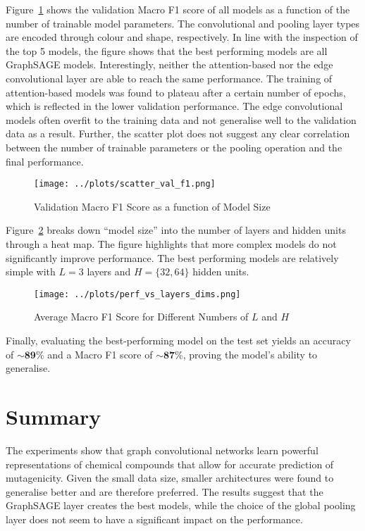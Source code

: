 \documentclass[10pt,conference,compsocconf]{IEEEtran}
\begin{document}
Figure~\ref{fig:scatter-val-f1} shows the validation Macro F1 score of all
models as a function of the number of trainable model parameters. The
convolutional and pooling layer types are encoded through colour and shape,
respectively. In line with the inspection of the top 5 models, the figure shows
that the best performing models are all GraphSAGE models. Interestingly, neither
the attention-based nor the edge convolutional layer are able to reach the same
performance. The training of attention-based models was found to plateau after a
certain number of epochs, which is reflected in the lower validation
performance. The edge convolutional models often overfit to the training data
and not generalise well to the validation data as a result. Further, the
scatter plot does not suggest any clear correlation between the number of
trainable parameters or the pooling operation and the final performance.

\begin{figure}[ht]
  \centering
  \texttt{[image: ../plots/scatter\_val\_f1.png]}
  \caption{Validation Macro F1 Score as a function of Model Size}
  \label{fig:scatter-val-f1}
\end{figure}

Figure~\ref{fig:perf_vs_layers} breaks down ``model size'' into the number of
layers and hidden units through a heat map. The figure highlights that more
complex models do not significantly improve performance. The best performing
models are relatively simple with $L=3$ layers and $H=\{32, 64\}$ hidden units.

\begin{figure}[ht]
  \centering
  \texttt{[image: ../plots/perf\_vs\_layers\_dims.png]}
  \caption{Average Macro F1 Score for Different Numbers of $L$ and $H$}
  \label{fig:perf_vs_layers}
\end{figure}

Finally, evaluating the best-performing model on the test set yields an accuracy
of $\sim\mathbf{89}\%$ and a Macro F1 score of $\sim\mathbf{87}\%$, proving the
model's ability to generalise.

\section{Summary}

The experiments show that graph convolutional networks learn powerful
representations of chemical compounds that allow for accurate prediction of
mutagenicity. Given the small data size, smaller architectures were found to
generalise better and are therefore preferred. The results suggest that the
GraphSAGE layer creates the best models, while the choice of the global pooling
layer does not seem to have a significant impact on the performance.
\end{document}
